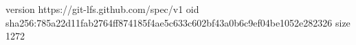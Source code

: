 version https://git-lfs.github.com/spec/v1
oid sha256:785a22d11fab2764ff874185f4ae5c633c602bf43a0b6c9ef04be1052e282326
size 1272
